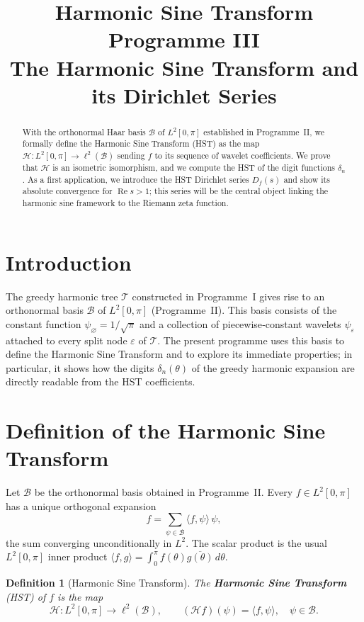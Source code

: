 \documentclass[11pt,a4paper]{article}
\title{\bfseries Harmonic Sine Transform Programme III\\
\large The Harmonic Sine Transform and its Dirichlet Series}
\author{}
\date{}
\newtheorem{definition}[theorem]{Definition}
\begin{document}
\maketitle

\begin{abstract}
With the orthonormal Haar basis \(\mathcal{B}\) of \(L^2[0,\pi]\) established in Programme~II, we formally define the Harmonic Sine Transform (HST) as the map \(\mathcal{H}: L^2[0,\pi] \to \ell^2(\mathcal{B})\) sending \(f\) to its sequence of wavelet coefficients.  We prove that \(\mathcal{H}\) is an isometric isomorphism, and we compute the HST of the digit functions \(\delta_n\).  As a first application, we introduce the HST Dirichlet series \(D_f(s)\) and show its absolute convergence for \(\operatorname{Re}s>1\); this series will be the central object linking the harmonic sine framework to the Riemann zeta function.
\end{abstract}

\section{Introduction}
The greedy harmonic tree \(\mathcal{T}\) constructed in Programme~I gives rise to an orthonormal basis \(\mathcal{B}\) of \(L^2[0,\pi]\) (Programme~II).  This basis consists of the constant function \(\psi_\varnothing = 1/\sqrt{\pi}\) and a collection of piecewise‑constant wavelets \(\psi_\varepsilon\) attached to every split node \(\varepsilon\) of \(\mathcal{T}\).  The present programme uses this basis to define the Harmonic Sine Transform and to explore its immediate properties; in particular, it shows how the digits \(\delta_n(\theta)\) of the greedy harmonic expansion are directly readable from the HST coefficients.

\section{Definition of the Harmonic Sine Transform}
Let \(\mathcal{B}\) be the orthonormal basis obtained in Programme~II.  Every \(f\in L^2[0,\pi]\) has a unique orthogonal expansion
\[
f = \sum_{\psi\in\mathcal{B}} \langle f,\psi\rangle \,\psi ,
\]
the sum converging unconditionally in \(L^2\).  The scalar product is the usual \(L^2[0,\pi]\) inner product \(\langle f,g\rangle = \int_0^\pi f(\theta)\overline{g(\theta)}\,d\theta\).

\begin{definition}[Harmonic Sine Transform]
The \textbf{Harmonic Sine Transform} (HST) of \(f\) is the map
\[
\mathcal{H} : L^2[0,\pi] \longrightarrow \ell^2(\mathcal{B}), \qquad
(\mathcal{H}f)(\psi) = \langle f,\psi\rangle ,\quad \psi\in\mathcal{B}.
\]
\end{definition}
\end{document}

